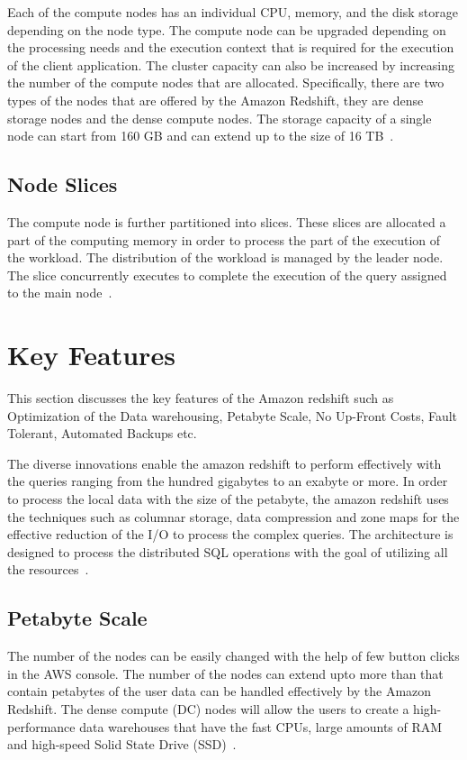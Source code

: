     	Each of the compute nodes has an individual CPU, memory, and the disk 
	storage depending on the node type. The compute node can be upgraded 
	depending on the processing needs and the execution context that is 
	required for the execution of the client application. The cluster 
	capacity can also be increased by increasing the number of the 
	compute nodes that are allocated. Specifically, there are two types 
	of the nodes that are offered by the Amazon Redshift,  they are dense 
	storage nodes and the dense compute nodes. The storage capacity of a 
	single node can start from 160 GB and can extend up to the size of 
	16 TB~\cite{hid-sp18-412-Amazon_Redshift_architecture}.
        
	\subsection{Node Slices}
        The compute node is further partitioned into slices. 
		These slices are allocated a part of the computing memory 
		in order to process the part of the execution of the workload. 
		The distribution of the workload is managed by the leader node. 
		The slice concurrently executes to complete the execution of 
		the query assigned to 
		the main node~\cite{hid-sp18-412-Amazon_Redshift_architecture}.

\section{Key Features}
\label{s:keyf}
	This section discusses the key features of the Amazon redshift such 
	as Optimization of the Data warehousing, Petabyte Scale, No Up-Front 
	Costs, Fault Tolerant, Automated Backups etc.

	The diverse innovations enable the amazon redshift to perform 
	effectively with the queries ranging from the hundred gigabytes 
	to an exabyte or more. In order to process the local data with 
	the size of the petabyte, the amazon redshift uses the techniques 
	such as columnar storage, data compression and zone maps for the 
	effective reduction of the I/O to process the complex queries. 
	The architecture is designed to process the distributed SQL 
	operations with the goal of utilizing all the 
	resources~\cite{hid-sp18-412-Amazon_Redshift_Official_Page}.
		
	\subsection{Petabyte Scale}
	 The number of the nodes can be easily changed with the help of 
	 few button clicks in the AWS console. The number of the nodes 
	 can extend upto more than that contain petabytes of the user data 
	 can be handled effectively by the Amazon Redshift. 
	 The dense compute (DC) nodes will allow the users 
	 to create a high-performance data warehouses that have the fast CPUs, 
	 large amounts of RAM and high-speed Solid 
	 State Drive (SSD)~\cite{hid-sp18-412-Amazon_Redshift_Official_Page}. 
    
